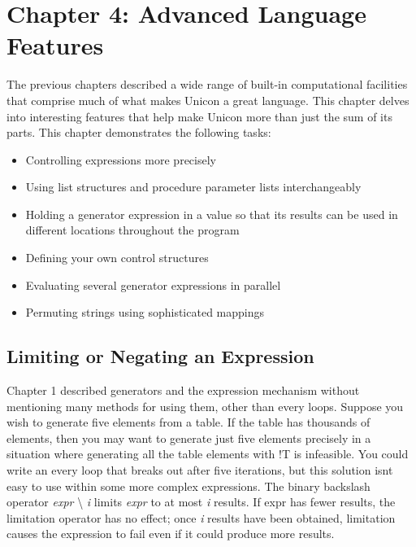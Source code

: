 \clearpage\section{Chapter 4: Advanced Language Features}
The previous chapters described a wide range of built-in computational
facilities that comprise much of what makes Unicon a great language.
This chapter delves into interesting features that help make Unicon
more than just the sum of its parts. This chapter demonstrates the
following tasks:

\begin{itemize}
\item Controlling expressions more precisely
\item Using list structures and procedure parameter lists
interchangeably
\item Holding a generator expression in a value so that
its results can be used in different locations throughout the program
\item Defining your own control structures
\item Evaluating several generator expressions in parallel
\item Permuting strings using sophisticated mappings
\end{itemize}
\subsection[Limiting or Negating an Expression]{Limiting or Negating an
Expression}
Chapter 1 described generators and the
expression mechanism without mentioning many methods for using them,
other than \textsf{every} loops. Suppose you wish to generate five
elements from a table. If the table has thousands of elements, then you
may want to generate just five elements precisely in a situation where
generating all the table elements with \textsf{!T} is infeasible. You
could write an \textsf{every} loop that breaks out after five
iterations, but this solution isn{\textquotesingle}t easy to use within
some more complex expressions. The binary backslash operator
\textsf{\textit{expr}}\textsf{ {\textbackslash} }\textsf{\textit{i}}
limits \textsf{\textit{expr}} to at most \textsf{\textit{i}} results.
If \textsf{expr} has fewer results, the limitation operator has no
effect; once \textsf{\textit{i}} results have been obtained, limitation
causes the expression to fail even if it
could produce more results.

